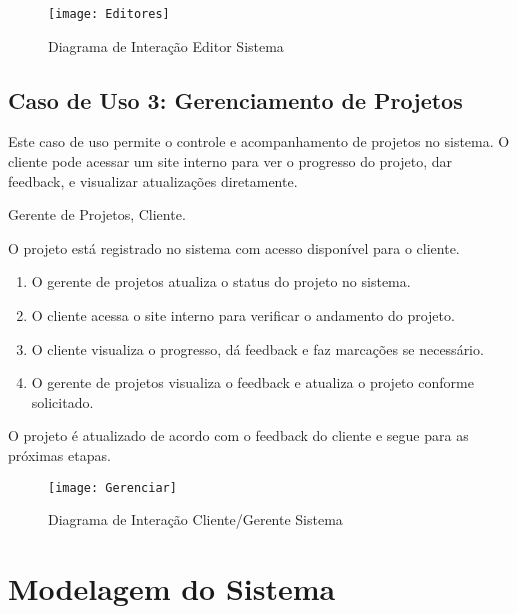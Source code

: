 \begin{figure}[ht]
    \centering
    \texttt{[image: Editores]}
    \caption{Diagrama de Interação Editor Sistema}
    \label{fig:diagram1}
\end{figure}

\subsection{Caso de Uso 3: Gerenciamento de Projetos}
\begin{description}[style=nextline]
    \item[Descrição:] Este caso de uso permite o controle e acompanhamento de projetos no sistema. O cliente pode acessar um site interno para ver o progresso do projeto, dar feedback, e visualizar atualizações diretamente.
    
    \item[Atores:] Gerente de Projetos, Cliente.
    
    \item[Pré-condição:] O projeto está registrado no sistema com acesso disponível para o cliente.
    
    \item[Sequência de Ações:]
    \begin{enumerate}
        \item O gerente de projetos atualiza o status do projeto no sistema.
        \item O cliente acessa o site interno para verificar o andamento do projeto.
        \item O cliente visualiza o progresso, dá feedback e faz marcações se necessário.
        \item O gerente de projetos visualiza o feedback e atualiza o projeto conforme solicitado.
    \end{enumerate}
    
    \item[Pós-condição:] O projeto é atualizado de acordo com o feedback do cliente e segue para as próximas etapas.
\end{description}

\begin{figure}[ht]
    \centering
    \texttt{[image: Gerenciar]}
    \caption{Diagrama de Interação Cliente/Gerente Sistema}
    \label{fig:diagram1}
\end{figure}

\pagebreak
\newpage

\section{Modelagem do Sistema}

